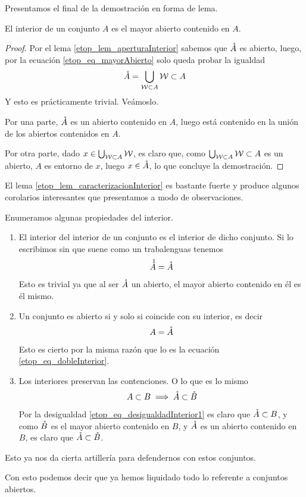 Presentamos el final de la demostración en forma de lema.
\begin{lem}
	\label{etop_lem_caracterizacionInterior}
	El interior de un conjunto $A$ es el mayor abierto contenido en $A$.
\end{lem}
\begin{proof}
	Por el lema \ref{etop_lem_aperturaInterior} sabemos que $\mathring{A}$ es abierto, luego, por la ecuación \eqref{etop_eq_mayorAbierto} solo queda probar la igualdad
	\begin{equation*}
	\mathring{A}=\bigcup_{\mathcal{W}\subset A}\mathcal{W}\subset A
	\end{equation*}
	Y esto es prácticamente trivial. Veámoslo.
	
	Por una parte, $\mathring{A}$ es un abierto contenido en $A$, luego está contenido en la unión de los abiertos contenidos en $A$.
	
	Por otra parte, dado $x\in\bigcup_{\mathcal{W}\subset A}\mathcal{W}$, es claro que, como $\bigcup_{\mathcal{W}\subset A}\mathcal{W}\subset A$ es un abierto, $A$ es entorno de $x$, luego $x\in\mathring{A}$, lo que concluye la demostración.
\end{proof}

El lema \ref{etop_lem_caracterizacionInterior} es bastante fuerte y produce algunos corolarios interesantes que presentamos a modo de observaciones.
\begin{obs}
	\label{etop_obs_propiedadesInterior}
	Enumeramos algunas propiedades del interior.
	\begin{enumerate}
		\item El interior del interior de un conjunto es el interior de dicho conjunto. Si lo escribimos sin que suene como un trabalenguas tenemos
		\begin{equation}
		\label{etop_eq_dobleInterior}
		\mathring{\mathring{A}}=\mathring{A}
		\end{equation}
		Esto es trivial ya que al ser $\mathring{A}$ un abierto, el mayor abierto contenido en él es él mismo.
		\item Un conjunto es abierto si y solo si coincide con su interior, es decir
		\begin{equation}
		\label{etop_eq_abiertoInterior}
		A=\mathring{A}
		\end{equation}
		Esto es cierto por la misma razón que lo es la ecuación \eqref{etop_eq_dobleInterior}.
		\item Los interiores preservan las contenciones. O lo que es lo mismo
		\begin{equation}
		\label{etop_eq_interiorContencion}
		A\subset B\implies \mathring{A}\subset\mathring{B}
		\end{equation}
		Por la desigualdad \eqref{etop_eq_desigualdadInterior1} es claro que $\mathring{A}\subset B$, y como $\mathring{B}$ es el mayor abierto contenido en $B$, y $\mathring{A}$ es un abierto contenido en $B$, es claro que $\mathring{A}\subset\mathring{B}$.
	\end{enumerate}
	Esto ya nos da cierta artillería para defendernos con estos conjuntos.
\end{obs}
Con esto podemos decir que ya hemos liquidado todo lo referente a conjuntos abiertos.
